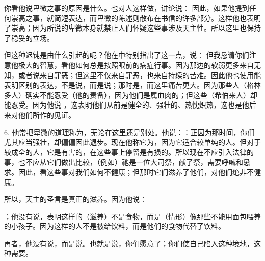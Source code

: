 你看他说卑微之事的原因是什么。也对人这样做，讲论说： 因此，如果他提到任何崇高之事，就简短表达，而卑微的陈述则散布在书信的许多部分。这样他也表明了崇高；因为所说的卑微本身就禁止人们怀疑这些事涉及天主性。所以这里也保持了稳妥的立场。\par

但这种迟钝是由什么引起的呢？他在中特别指出了这一点，说： 但我恳请你们注意他极大的智慧，看他如何总是按照眼前的病症行事。因为那边的软弱更多来自无知，或者说来自罪恶；但这里不仅来自罪恶，也来自持续的苦难。因此他也使用能表明区别的表达，不是说，而是说；那时是，而这里痛苦更大。因为那些人（格林多人）确实不能忍受（他的责备），因为他们是属血肉的；但这些（希伯来人）却能忍受。因为他说 ，这表明他们从前是健全的、强壮的、热忱炽热，这也是他后来对他们所作的见证。\par

6. 他常把卑微的道理称为，无论在这里还是别处。他说：：正因为那时间，你们尤其应当强壮，却偏偏因此退步。现在他称它为，因为它适合较单纯的人。但对于较成全的人，它是有害的，在这些事上停留是有损的。所以现在不应引入法律的事，也不应从它们做出比较，（例如）祂是一位大司祭，献了祭，需要呼喊和恳求。因此，看这些事对我们如何不健康；但那时它们滋养了他们，对他们绝非不健康。\par

所以，天主的圣言是真正的滋养。因为他说： \par

 ；他没有说，表明这样的（滋养）不是食物，而是（情形）像那些不能用面包喂养的小孩子。因为这样的人不是被给饮料，而是他们的食物代替了饮料。\par

再者，他没有说，而是说。也就是说，你们愿意了；你们使自己陷入这种境地，这种需要。\par


